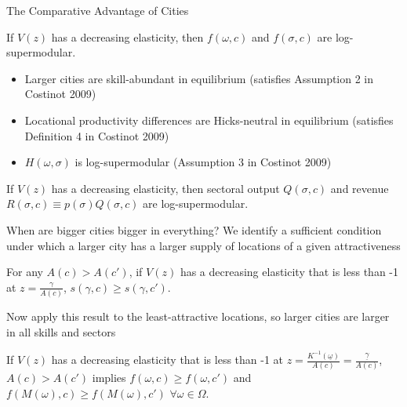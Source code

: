 \documentclass[10pt,notes=hide]{beamer}
\begin{document}
\begin{frame}{The Comparative Advantage of Cities}
\begin{corollary}
\label{cor:Skills-and-Sectors}If $V(z)$ has a decreasing elasticity,
then $f(\omega,c)$ and $f(\sigma,c)$ are log-supermodular.
\end{corollary}
\pause
\begin{itemize}
\item {\small{}Larger cities are skill-abundant in equilibrium (satisfies
Assumption 2 in Costinot 2009)}{\small \par}
\item {\small{}Locational productivity differences are Hicks-neutral in
equilibrium (satisfies Definition 4 in Costinot 2009)}{\small \par}
\item {\small{}$H(\omega,\sigma)$ is log-supermodular (Assumption 3 in
Costinot 2009)}{\small \par}\end{itemize}
\begin{corollary}
\label{Cor:Outputs-and-Revenues}If $V(z)$ has a decreasing elasticity,
then sectoral output $Q(\sigma,c)$ and revenue $R(\sigma,c)\equiv p(\sigma)Q(\sigma,c)$
are log-supermodular.
\end{corollary}
\end{frame}
\begin{frame}{When are bigger cities bigger in everything?}
We identify a sufficient condition under which a larger city has a
larger supply of locations of a given attractiveness
\begin{proposition}
\label{prop:AbsoluteSize}For any $A(c)>A(c')$, if $V(z)$ has a
decreasing elasticity that is less than -1 at $z=\frac{\gamma}{A(c)}$,
$s(\gamma,c)\geq s(\gamma,c')$.
\end{proposition}
Now apply this result to the least-attractive locations, so larger
cities are larger in all skills and sectors
\begin{corollary}
\label{cor:AbsoluteSize}If $V(z)$ has a decreasing elasticity that
is less than -1 at $z=\frac{K^{-1}(\underline{\omega})}{A(c)}=\frac{\underline{\gamma}}{A(c)}$,
$A(c)>A(c')$ implies $f(\omega,c)\geq f(\omega,c')$ and $f(M(\omega),c)\geq f(M(\omega),c')$
$\forall\omega\in\Omega$.
\end{corollary}
\end{frame}
\end{document}
